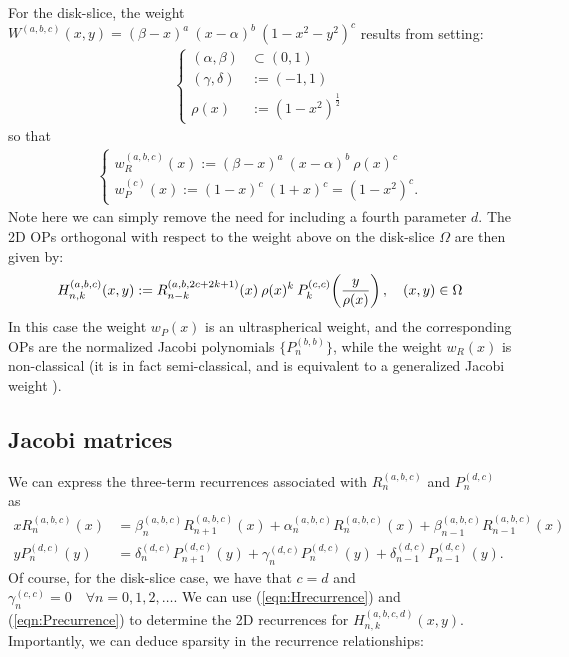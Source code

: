 \documentclass[11pt, oneside]{article}   	%
\newcommand{\half}{\frac{1}{2}}
\newcommand{\R}{\mathbb{R}}
\newcommand{\hdop}{H}
\newcommand{\Wab}{{W^{(a,b)}}}
\newcommand{\jac}{{P}}
\newcommand{\genjac}{R}
\newcommand{\genjacnmk}{\genjac_{n-k}}
\newcommand{\genjacw}{w_\genjac}
\newcommand{\jacw}{w_P}
\newcommand{\hdopnkabc}{\hdop_{n,k}^{(a,b,c)}}
\newcommand{\Wabc}{{W^{(a,b,c)}}}
\newcommand{\hdopnkabcd}{\hdop_{n,k}^{(a,b,c,d)}}
\begin{document}
For the disk-slice, the weight $\Wabc(x,y) = (\beta - x)^a \: (x - \alpha)^b \: (1-x^2-y^2)^c$ results from setting:
\begin{align*}
\begin{cases}
	(\alpha,\beta) &\subset (0,1) \\
	(\gamma,\delta) &:= (-1,1) \\
	\rho(x) &:= (1-x^2)^{\half}
\end{cases}
\end{align*}
so that
\begin{align*}
\begin{cases}
	\genjacw^{(a,b,c)}(x) :=  (\beta - x)^a \: (x - \alpha)^b \: \rho(x)^{c} \\
	\jacw^{(c)}(x) := (1-x)^c \: (1+x)^c = (1-x^2)^c.
\end{cases}
\end{align*}
Note here we can simply remove the need for including a fourth parameter $d$. The 2D OPs orthogonal with respect to the weight above on the disk-slice $\Omega$ are then given by:
\begin{align}\label{eq:diskpolys}
	\hdopnkabc(x,y) := \genjacnmk^{(a, b, 2c+2k+1)}(x) \: \rho(x)^k \: \jac_k^{(c,c)}\fpr(\frac{y}{\rho(x)}), \quad (x,y) \in \Omega
\end{align}
In this case the weight $\jacw(x)$ is an ultraspherical weight, and the corresponding OPs are the normalized Jacobi polynomials $\{\jac_n^{(b, b)}\}$, while the weight $w_R(x)$ is non-classical (it is in fact semi-classical, and is equivalent to a generalized Jacobi weight \cite[\S5]{magnus1995painleve}).



\subsection{Jacobi matrices}

We can express the three-term recurrences associated with $\genjac_n^{(a,b,c)}$ and $\jac_n^{(d,c)}$ as 
\begin{align}
	x \genjac_n^{(a,b,c)}(x) &= \beta_n^{(a,b,c)} \genjac_{n+1}^{(a,b,c)}(x) + \alpha_n^{(a,b,c)} \genjac_n^{(a,b,c)}(x) + \beta_{n-1}^{(a,b,c)} \genjac_{n-1}^{(a,b,c)}(x) \label{eqn:Hrecurrence} \\
	y \jac_n^{(d,c)}(y) &= \delta_n^{(d,c)} \jac_{n+1}^{(d,c)}(y) + \gamma_{n}^{(d,c)} \jac_{n}^{(d,c)}(y) + \delta_{n-1}^{(d,c)} \jac_{n-1}^{(d,c)}(y). \label{eqn:Precurrence}
\end{align}
Of course, for the disk-slice case, we have that $c = d$ and $\gamma_{n}^{(c,c)} = 0 \quad \forall n=0,1,2,\dots$. We can use (\ref{eqn:Hrecurrence}) and (\ref{eqn:Precurrence}) to determine the 2D recurrences for $\hdopnkabcd(x,y)$. Importantly, we can deduce sparsity in the recurrence relationships:
\end{document}
